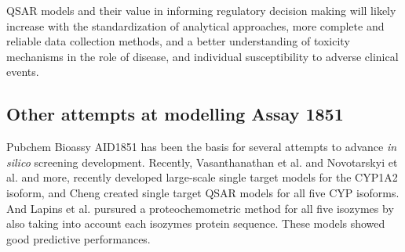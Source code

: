 

QSAR models and their value in informing regulatory decision making will likely increase with the standardization of analytical approaches, more complete and reliable data collection methods, and a better understanding of toxicity mechanisms in the role of disease, and individual susceptibility to adverse clinical events.\cite{Kruhlak2012}

\subsection{Other attempts at modelling Assay 1851}
Pubchem Bioassy AID1851 has been the basis for several attempts to advance \textit{in silico} screening development. Recently, Vasanthanathan et al. and Novotarskyi et al. and more, recently developed large-scale single target models for the CYP1A2 isoform, and Cheng created single target QSAR models for all five CYP isoforms.\cite{Vasanthanathan2012, Novotarskyi2012, Cheng2012} And Lapins et al. pursured a proteochemometric method for all five isozymes by also taking into account each isozymes protein sequence. \cite{Lapins2013} These models showed good predictive performances.

